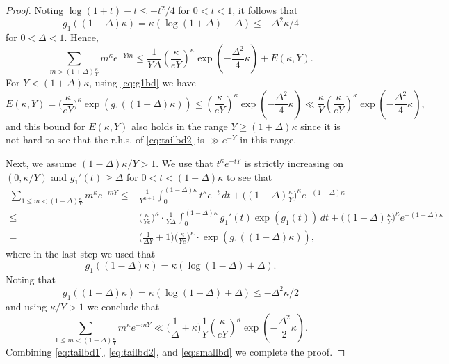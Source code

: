 \documentclass[10pt,a4paper]{amsart}
\begin{document}
\begin{proof}
Noting $\log (1+t)-t \le -t^2/4$ for $0<t<1$,
it follows that
\begin{equation} \label{eq:g1bd}
g_1((1+\Delta)\kappa)=\kappa(\log(1+\Delta)-\Delta) \le -\Delta^2\kappa/4
\end{equation}
for $0 < \Delta <1$.
Hence,
\begin{equation} \label{eq:tailbd1}
\sum_{m >(1+\Delta) \frac{\kappa}{Y}} m^{\kappa} e^{-Ym} \le \frac{1}{Y\Delta}  \left( \frac{\kappa}{e Y}\right)^{\kappa} \exp\left( -\frac{\Delta^2}{4} \kappa \right)+E(\kappa,Y).
\end{equation}
For $Y< (1+\Delta)\kappa$, using \eqref{eq:g1bd} we have
\begin{equation} \label{eq:tailbd2}
E(\kappa,Y) = \bigg(\frac{\kappa}{eY} \bigg)^{\kappa} \exp(g_1((1+\Delta)\kappa)) \le   \left( \frac{\kappa}{e Y}\right)^{\kappa} \exp\left( -\frac{\Delta^2}{4} \kappa \right) \ll \frac{\kappa }{Y} \left( \frac{\kappa}{e Y}\right)^{\kappa} \exp\left( -\frac{\Delta^2}{4} \kappa \right),
\end{equation}
and this bound for $E(\kappa,Y)$ also holds in the range $Y\ge (1+\Delta)\kappa $ since it is not hard to see that the r.h.s. of \eqref{eq:tailbd2} is $\gg e^{-Y}$ in this range.




Next, we assume $(1-\Delta)\kappa/Y > 1$.
We use that $t^{\kappa}e^{-tY}
$ is strictly increasing on $(0,\kappa/Y)$ and $g_1'(t)\ge \Delta$ for $0<t<(1-\Delta)\kappa$ to see that
\[
\begin{split}
\sum_{1 \le m < (1-\Delta)\frac{\kappa}{Y}} m^{\kappa} e^{-mY}
\le& \frac{1}{Y^{\kappa +1}}\int_0^{(1-\Delta)\kappa} t^{\kappa} e^{-t} \, dt+ \bigg((1-\Delta) \frac{\kappa}{Y} \bigg)^{\kappa} e^{-(1-\Delta)\kappa}\\
\le& \bigg( \frac{\kappa}{Ye}\bigg)^{\kappa} \cdot \frac{1}{Y\Delta} \int_0^{(1-\Delta)\kappa} g_1'(t) \exp(g_1(t)) \, dt+\bigg((1-\Delta) \frac{\kappa}{Y} \bigg)^{\kappa} e^{-(1-\Delta)\kappa}\\
=& \bigg(\frac{1}{\Delta Y}+1 \bigg) \bigg( \frac{\kappa}{Ye}\bigg)^{\kappa} \cdot  \exp(g_1((1-\Delta)\kappa)),
\end{split}
\]
where in the last step we used that
\[
g_1((1-\Delta)\kappa)=\kappa(\log(1-\Delta)+\Delta).
\]
Noting that \[g_1((1-\Delta)\kappa)=\kappa(\log (1-\Delta)+\Delta) \le -\Delta^2 \kappa/2\]
and using $\kappa/Y>1$ we conclude that
\begin{equation} \label{eq:smallbd}
\sum_{1 \le m < (1-\Delta)\frac{\kappa}{Y}} m^{\kappa} e^{-mY} \ll \bigg(\frac{1}{ \Delta } +\kappa\bigg)\frac{1}{Y}\left( \frac{\kappa}{e Y}\right)^{\kappa} \exp\left( -\frac{\Delta^2}{2} \kappa \right).
\end{equation}
Combining \eqref{eq:tailbd1}, \eqref{eq:tailbd2}, and \eqref{eq:smallbd} we complete the proof.
\end{proof}
\end{document}
